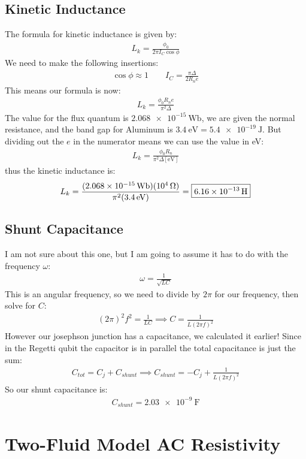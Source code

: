 \documentclass[12pt]{article}
\begin{document}
\subsection{Kinetic Inductance}
The formula for kinetic inductance is given by:
\begin{align*}
  L_k=\frac{\phi_0}{2\pi I_C\cos\phi}
\end{align*}
We need to make the following insertions:
\begin{align*}
  \cos\phi\approx 1\qquad I_C=\frac{\pi\Delta}{2R_ne}
\end{align*}
This means our formula is now:
\begin{align*}
  L_k=\frac{\phi_0R_ne}{\pi^2\Delta}
\end{align*}
The value for the flux quantum is $\SI{2.068e-15}{\weber}$, we are given the normal resistance, and the band gap for Aluminum is $\SI{3.4}{\eV}=\SI{5.4e-19}{\J}$. But dividing out the $e$ in the numerator means we can use the value in eV:
\begin{align*}
  L_k=\frac{\phi_0R_n}{\pi^2\Delta[\si{\eV}]}
\end{align*}
thus the kinetic inductance is:
\begin{align*}
  L_k=\frac{(\SI{2.068e-15}{\weber})(\SI{e4}{\ohm})}{
  \pi^2(\SI{3.4}{\eV})}=\boxed{\SI{6.16e-13}{\H}}
\end{align*}
\subsection{Shunt Capacitance}
I am not sure about this one, but I am going to assume it has to do with the frequency $\omega$:
\begin{align*}
  \omega=\frac{1}{\sqrt{LC}}
\end{align*}
This is an angular frequency, so we need to divide by $2\pi$ for our frequency, then solve for $C$:
\begin{align*}
  (2\pi)^2f^2=\frac{1}{LC}\implies C=\frac{1}{L(2\pi f)^2}
\end{align*}
However our josephson junction has a capacitance, we calculated it earlier! Since in the Regetti qubit the capacitor is in parallel the total capacitance is just the sum:
\begin{align*}
  C_{tot}=C_j+C_{shunt}\implies C_{shunt}=-C_j+\frac{1}{L(2\pi f)^2}
\end{align*}
So our shunt capacitance is:
\begin{align*}
  \boxed{C_{shunt}=\SI{2.03e-9}{\F}}
\end{align*}
\newpage\section{Two-Fluid Model AC Resistivity}
\end{document}
